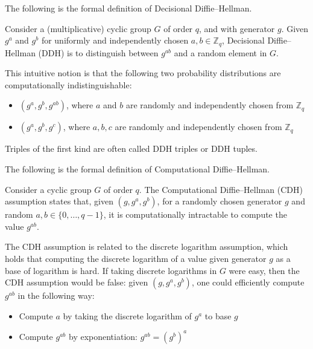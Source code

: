 The following is the formal definition of Decisional Diffie–Hellman.



\begin{definition}
\normalfont
Consider a (multiplicative) cyclic group $G$ of order $q$, and with generator $g$. Given $g^{a}$ and $g^{b}$ for uniformly and independently chosen $a,b\in \mathbb {Z} _{q}$, Decisional Diffie–Hellman (DDH) is to distinguish between $g^{ab}$ and a random element in $G$.
\end{definition}


This intuitive notion is that the following two probability distributions are computationally indistinguishable:
\begin{itemize}
    \item $(g^{a},g^{b},g^{ab})$, where $a$ and $b$ are randomly and independently chosen from $\mathbb {Z} _{q}$
    \item $(g^{a},g^{b},g^{c})$, where $a,b,c$ are randomly and independently chosen from $\mathbb {Z} _{q}$
\end{itemize}
Triples of the first kind are often called DDH triples or DDH tuples.

The following is the formal definition of Computational Diffie–Hellman.

\begin{definition}
\normalfont
Consider a cyclic group $G$ of order $q$. The Computational Diffie–Hellman (CDH) assumption states that, given $(g,g^{a},g^{b})$, for a randomly chosen generator $g$ and random $a,b\in \{0,\ldots ,q-1\}$, it is computationally intractable to compute the value $g^{{ab}}$.
\end{definition}

The CDH assumption is related to the discrete logarithm assumption, which holds that computing the discrete logarithm of a value given generator $g$ as a base of logarithm is hard. If taking discrete logarithms in $G$ were easy, then the CDH assumption would be false: given $(g,g^{a},g^{b})$, one could efficiently compute $g^{ab}$ in the following way:

\begin{itemize}
    \item Compute $a$ by taking the discrete logarithm of $g^{a}$ to base $g$
    \item Compute $g^{ab}$ by exponentiation: $g^{{ab}}=(g^{b})^{a}$
\end{itemize}



